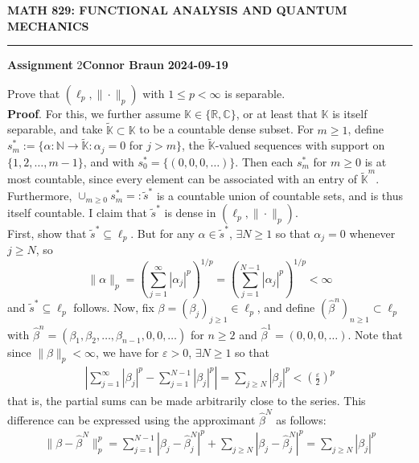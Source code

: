 \documentclass[10pt]{article}
\newcommand{\mbb}[1]{\mathbb{#1}}
\newcommand{\1}[1]{\mathbbm{1}_{#1}}
\begin{document}
    \begin{center}
        {\bf\large{MATH 829: FUNCTIONAL ANALYSIS AND QUANTUM MECHANICS}}
        \smallskip
        \hrule
        \smallskip
        {\bf Assignment} 2\hfill {\bf Connor Braun} \hfill {\bf 2024-09-19}
    \end{center}
    \vspace{5pt}
     Prove that $(\ell_p,\|\cdot\|_p)$ with $1\leq p<\infty$ is separable.\\[5pt]
    {\bf Proof}. For this, we further assume $\mbb{K}\in\{\mbb{R},\mbb{C}\}$, or at least that $\mbb{K}$ is itself separable, and take $\widetilde{\mbb{K}}\subset\mbb{K}$ to be a countable dense subset.
    For $m\geq 1$, define $s^\ast_m:=\{\alpha:\mbb{N}\rightarrow\widetilde{\mbb{K}}:\alpha_j=0$ for $j>m\}$, the $\widetilde{\mbb{K}}$-valued sequences with support on $\{1,2,\dots,m-1\}$, and with $s^\ast_0=\{(0,0,0,\dots)\}$.
    Then each $s^\ast_m$ for $m\geq 0$ is at most countable, since every element can be associated with an entry of $\widetilde{\mbb{K}}^{m}$. Furthermore, $\cup_{m\geq 0}s^\ast_m=:\widetilde{s}^\ast$ is a countable union of countable sets, and is thus itself
    countable. I claim that $\widetilde{s}^\ast$ is dense in $(\ell_p,\|\cdot\|_p)$.\\[5pt]
    First, show that $\widetilde{s}^\ast\subseteq\ell_p$. But for any $\alpha\in\widetilde{s}^\ast$, $\exists N\geq 1$ so that $\alpha_j=0$ whenever $j\geq N$, so
    \[\|\alpha\|_p=(\sum_{j=1}^\infty|\alpha_j|^p)^{1/p}=(\sum_{j=1}^{N-1}|\alpha_j|^p)^{1/p}<\infty\]
    and $\widetilde{s}^\ast\subseteq\ell_p$ follows. Now, fix $\beta=(\beta_j)_{j\geq 1}\in\ell_p$, and define $(\hat{\beta}^n)_{n\geq 1}\subset\ell_p$ with $\hat{\beta}^n=(\beta_1,\beta_2,\dots,\beta_{n-1},0,0,\dots)$ for $n\geq 2$ and $\hat{\beta}^1=(0,0,0,\dots)$.
    Note that since $\|\beta\|_p<\infty$, we have for $\varepsilon>0$, $\exists N\geq 1$ so that
    \begin{align*}
        \left|\sum_{j=1}^\infty|\beta_j|^p-\sum_{j=1}^{N-1}|\beta_j|^p\right|=\sum_{j\geq N}|\beta_j|^p<\left(\frac{\varepsilon}{2}\right)^{p}\tag{10}
    \end{align*}
    that is, the partial sums can be made arbitrarily close to the series. This difference can be expressed using the approximant $\hat{\beta}^N$ as follows:
    \begin{align*}
        \|\beta-\hat{\beta}^N\|_p^p=\sum_{j=1}^{N-1}|\beta_j-\hat{\beta}_j^N|^p+\sum_{j\geq N}|\beta_j-\hat{\beta}_j^N|^p=\sum_{j\geq N}|\beta_j|^p\tag{11}
    \end{align*}
\end{document}
